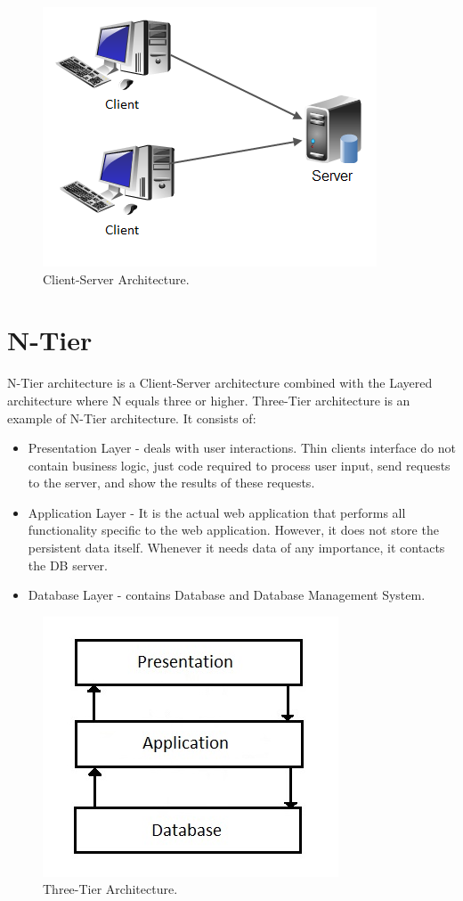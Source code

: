 \documentclass{article}
\begin{document}
\begin{figure}[h]
\centering
\includegraphics[scale=1]{cs.png}
\caption{Client-Server Architecture.}
\label{fig_cs}
\end{figure}

\newpage

\section{N-Tier}
N-Tier architecture is a Client-Server architecture combined with the Layered architecture where N equals three or higher. Three-Tier architecture is an example of N-Tier architecture. It consists of:

\begin{itemize}

\item Presentation Layer - deals with user interactions. Thin clients interface do not contain business logic, just code required to process user input, send requests to the server, and show the results of these requests. 
\item Application Layer - It is the actual web application that performs all functionality specific to the web application. However, it does not store the persistent data itself. Whenever it needs data of any importance, it contacts the DB server. 
\item Database Layer - contains Database and Database Management System. 

\end{itemize}


\begin{figure}[h]
\centering
\includegraphics[scale=1]{3t.jpg}
\caption{Three-Tier Architecture.}
\label{fig_3t}
\end{figure}
\end{document}
